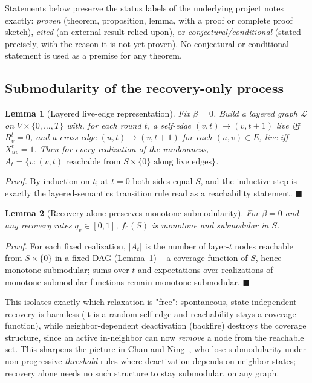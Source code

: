 \documentclass[journal]{IEEEtran}
\newtheorem{lemma}{Lemma}
\begin{document}
Statements below preserve the status labels of the underlying project
notes exactly: \emph{proven} (theorem, proposition, lemma, with a proof or
complete proof sketch), \emph{cited} (an external result relied upon), or
\emph{conjectural/conditional} (stated precisely, with the reason it is
not yet proven). No conjectural or conditional statement is used as a
premise for any theorem.

\subsection{Submodularity of the recovery-only process}

\begin{lemma}[Layered live-edge representation]
\label{lem:layered}
Fix $\beta=0$. Build a layered graph $\mathcal{L}$ on $V\times\{0,\dots,T\}$
with, for each round $t$, a self-edge $(v,t)\to(v,t{+}1)$ live iff
$R^t_v=0$, and a cross-edge $(u,t)\to(v,t{+}1)$ for each $(u,v)\in E$, live
iff $X^t_{uv}=1$. Then for every realization of the randomness,
$A_t = \{v : (v,t) \text{ reachable from } S\times\{0\}\text{ along live edges}\}$.
\end{lemma}
\emph{Proof.} By induction on $t$; at $t=0$ both sides equal $S$, and the
inductive step is exactly the layered-semantics transition rule read as a
reachability statement. $\blacksquare$

\begin{lemma}[Recovery alone preserves monotone submodularity]
\label{lem:recovery-submodular}
For $\beta=0$ and any recovery rates $q_v\in[0,1]$, $f_0(S)$ is monotone and
submodular in $S$.
\end{lemma}
\emph{Proof.} For each fixed realization, $|A_t|$ is the number of
layer-$t$ nodes reachable from $S\times\{0\}$ in a fixed DAG (Lemma~\ref{lem:layered}) --
a coverage function of $S$, hence monotone submodular; sums over $t$ and
expectations over realizations of monotone submodular functions remain
monotone submodular. $\blacksquare$

This isolates exactly which relaxation is "free": spontaneous,
state-independent recovery is harmless (it is a random self-edge and
reachability stays a coverage function), while neighbor-dependent
deactivation (backfire) destroys the coverage structure, since an active
in-neighbor can now \emph{remove} a node from the reachable set. This
sharpens the picture in Chan and Ning~\cite{chan2015influence}, who lose
submodularity under non-progressive \emph{threshold} rules where
deactivation depends on neighbor states; recovery alone needs no such
structure to stay submodular, on any graph.
\end{document}
